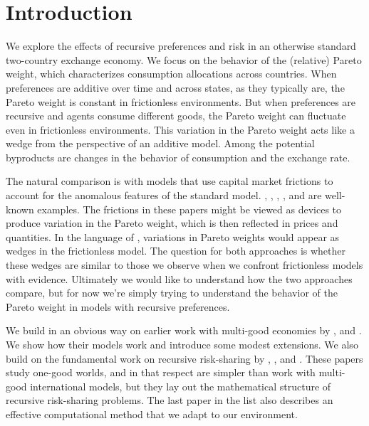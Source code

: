 
\section{Introduction}

We explore the effects of recursive preferences and risk
in an otherwise standard two-country exchange economy.
We focus on the behavior of the (relative) Pareto weight,
which characterizes consumption allocations across countries.
When preferences are additive over time and across states, as they typically are,
the Pareto weight is constant in frictionless environments.
But when preferences are recursive
and agents consume different goods,
the Pareto weight can fluctuate even in frictionless environments.
This variation in the Pareto weight acts like a wedge from the perspective
of an additive model.
Among the potential byproducts are changes in the behavior
of consumption and the exchange rate.

The natural comparison is with models that use capital market frictions
to account for the anomalous features of the standard  model.
\citet{Baxter1995-nl}, \citet{Corsetti2008-lx},
\citet{Heathcote2002-aw}, \citet{Kehoe2002-lq},
and \citet{Kose2006-os}
are well-known examples.
The frictions in these papers might be viewed as devices to produce variation in the Pareto weight,
which is then reflected in prices and quantities.
In the language of \citet{Chari2007-kq},
variations in Pareto weights would appear as wedges in the frictionless model.
The question for both approaches is whether these wedges are similar to those we observe when we
confront frictionless models with evidence.
Ultimately we would like to understand how the two approaches compare,
but for now we're simply trying to understand the behavior of the Pareto weight in models
with recursive preferences.


We build in an obvious way on earlier work
with multi-good economies by
\citet{Colacito2013-yq,Colacito2011-zp,Colacito2014-ph,Kollmann2015-sy},
and \citet{Tretvoll2011-lo,Tretvoll2015-lo,Tretvoll2018-dj}.
We show how their models work and introduce some modest extensions.
We also build on the fundamental work on recursive risk-sharing by
\citet{Anderson2005-of}, \citet{Borovicka2016-rr},
and \citet{Collin-dufresne2015-gt}.
These papers study one-good worlds,
and in that respect are simpler than work with multi-good international models,
but they lay out the mathematical structure of recursive risk-sharing problems.
The last paper in the list also describes an effective computational method
that we adapt to our environment.

